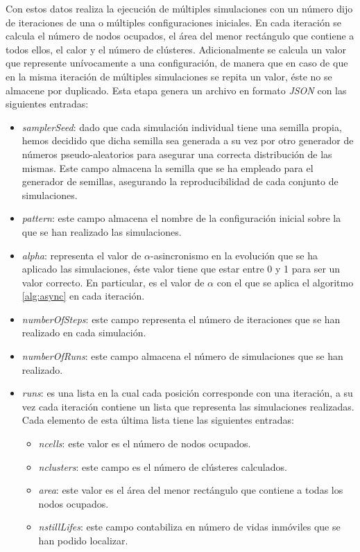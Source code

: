 \documentclass[../proyecto.tex]{memoir}
\begin{document}
Con estos datos realiza la ejecución de múltiples simulaciones con un número dijo de iteraciones de una o múltiples configuraciones iniciales. En cada iteración se calcula el número de nodos ocupados, el área del menor rectángulo que contiene a todos ellos, el calor y el número de clústeres. Adicionalmente se calcula un valor que represente unívocamente a una configuración, de manera que en caso de que en la misma iteración de múltiples simulaciones se repita un valor, éste no se almacene por duplicado. Esta etapa genera un archivo en formato \textit{JSON} \cite{json} con las siguientes entradas:

\begin{itemize}
\item \textit{samplerSeed}: dado que cada simulación individual tiene una semilla propia, hemos decidido que dicha semilla sea generada a su vez por otro generador de números pseudo-aleatorios para asegurar una correcta distribución de las mismas. Este campo almacena la semilla que se ha empleado para el generador de semillas, asegurando la reproducibilidad de cada conjunto de simulaciones.
\item \textit{pattern}: este campo almacena el nombre de la configuración inicial sobre la que se han realizado las simulaciones.
\item \textit{alpha}: representa el valor de $\alpha$-asincronismo en la evolución que se ha aplicado las simulaciones, éste valor tiene que estar entre 0 y 1 para ser un valor correcto. En particular, es el valor de $\alpha$ con el que se aplica el algoritmo \ref{alg:async} en cada iteración.
\item \textit{numberOfSteps}: este campo representa el número de iteraciones que se han realizado en cada simulación.
\item \textit{numberOfRuns}: este campo almacena el número de simulaciones que se han realizado.
\item \textit{runs}: es una lista en la cual cada posición corresponde con una iteración, a su vez cada iteración contiene un lista que representa las simulaciones realizadas. Cada elemento de esta última lista tiene las siguientes entradas:
\begin{itemize}
	\item \textit{ncells}: este valor es el número de nodos ocupados.
	\item \textit{nclusters}: este campo es el número de clústeres calculados.
	\item \textit{area}: este valor es el área del menor rectángulo que contiene a todas los nodos ocupados.
	\item \textit{nstillLifes}: este campo contabiliza en número de vidas inmóviles que se han podido localizar.
\end{itemize}
\end{itemize}
\end{document}
